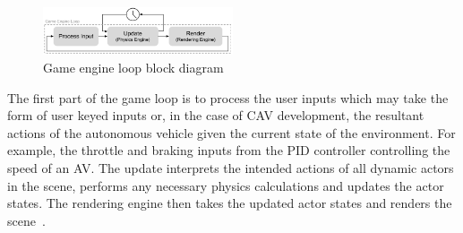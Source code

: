 \begin{figure}[h]
\centering
\includegraphics[width=0.5\textwidth]{Other/Figures/GameEngineLoop.pdf}
\caption{Game engine loop block diagram}
\label{GameEngineLoopDiagram}
\end{figure}
The first part of the game loop is to process the user inputs which may take the form of user keyed inputs or, in the case of CAV development, the resultant actions of the autonomous vehicle given the current state of the environment. For example, the throttle and braking inputs from the PID controller controlling the speed of an AV. %
%
The update interprets the intended actions of all dynamic actors in the scene, performs any necessary physics calculations and updates the actor states. %
%
The rendering engine then takes the updated actor states and renders the scene~\cite{GameProgPatternsBook}. %

